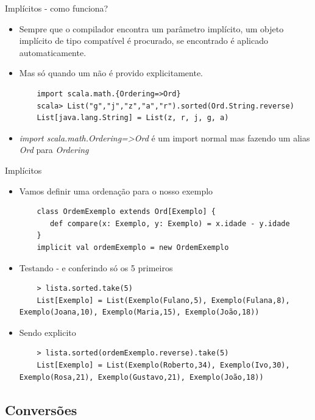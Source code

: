 \documentclass{beamer}
\begin{document}
\begin{frame}[fragile]{Implícitos - como funciona?} 
    \begin{itemize} [<+->]
	\item Sempre que o compilador encontra um parâmetro implícito, um objeto implícito de tipo compatível é procurado, se encontrado é aplicado automaticamente. 
	\item Mas só quando um não é provido explicitamente.
	\begin{lstlisting}
	import scala.math.{Ordering=>Ord}	
	scala> List("g","j","z","a","r").sorted(Ord.String.reverse)
	List[java.lang.String] = List(z, r, j, g, a)
	\end{lstlisting}
	\item<2->  \emph{import scala.math.{Ordering=>Ord}} é um import normal mas fazendo um alias \emph{Ord} para \emph{Ordering}

    \end{itemize}
\end{frame}

\begin{frame}[fragile]{Implícitos} 
    \begin{itemize} [<+->]
	\item Vamos definir uma ordenação para o nosso exemplo
	\begin{lstlisting}
	class OrdemExemplo extends Ord[Exemplo] { 
	   def compare(x: Exemplo, y: Exemplo) = x.idade - y.idade 
	}
	implicit val ordemExemplo = new OrdemExemplo
	\end{lstlisting}
	\item Testando - e conferindo só os 5 primeiros 
	\begin{lstlisting}
	> lista.sorted.take(5)
	List[Exemplo] = List(Exemplo(Fulano,5), Exemplo(Fulana,8), Exemplo(Joana,10), Exemplo(Maria,15), Exemplo(João,18))
	\end{lstlisting}
	\item Sendo explicito
	\begin{lstlisting}	
	> lista.sorted(ordemExemplo.reverse).take(5)
	List[Exemplo] = List(Exemplo(Roberto,34), Exemplo(Ivo,30), Exemplo(Rosa,21), Exemplo(Gustavo,21), Exemplo(João,18))
	\end{lstlisting}
    \end{itemize}
\end{frame}

\subsection{Conversões}
\end{document}
